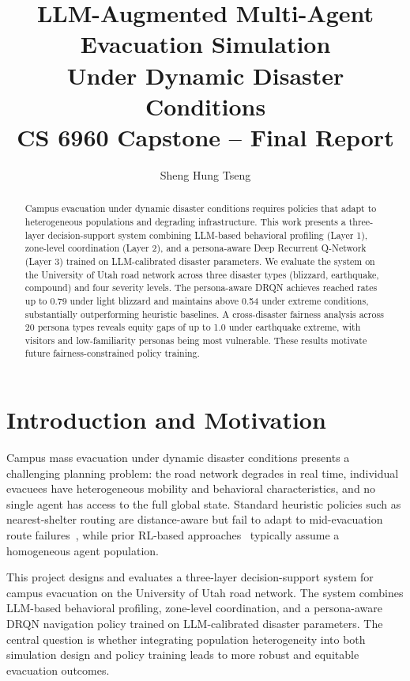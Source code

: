 \documentclass[11pt]{article}
\title{\textbf{LLM-Augmented Multi-Agent Evacuation Simulation\\
Under Dynamic Disaster Conditions}\\[0.4em]
\large CS 6960 Capstone -- Final Report}
\author{Sheng Hung Tseng}
\date{}
\begin{document}
\maketitle

\onehalfspacing

\begin{abstract}
Campus evacuation under dynamic disaster conditions requires policies that adapt to heterogeneous populations and degrading infrastructure. This work presents a three-layer decision-support system combining LLM-based behavioral profiling (Layer 1), zone-level coordination (Layer 2), and a persona-aware Deep Recurrent Q-Network (Layer 3) trained on LLM-calibrated disaster parameters. We evaluate the system on the University of Utah road network across three disaster types (blizzard, earthquake, compound) and four severity levels. The persona-aware DRQN achieves reached rates up to 0.79 under light blizzard and maintains above 0.54 under extreme conditions, substantially outperforming heuristic baselines. A cross-disaster fairness analysis across 20 persona types reveals equity gaps of up to 1.0 under earthquake extreme, with visitors and low-familiarity personas being most vulnerable. These results motivate future fairness-constrained policy training.
\end{abstract}

\section{Introduction and Motivation}

Campus mass evacuation under dynamic disaster conditions presents a challenging planning problem: the road network degrades in real time, individual evacuees have heterogeneous mobility and behavioral characteristics, and no single agent has access to the full global state. Standard heuristic policies such as nearest-shelter routing are distance-aware but fail to adapt to mid-evacuation route failures~\cite{chen2018}, while prior RL-based approaches~\cite{mnih2015} typically assume a homogeneous agent population.

This project designs and evaluates a three-layer decision-support system for campus evacuation on the University of Utah road network. The system combines LLM-based behavioral profiling, zone-level coordination, and a persona-aware DRQN navigation policy trained on LLM-calibrated disaster parameters. The central question is whether integrating population heterogeneity into both simulation design and policy training leads to more robust and equitable evacuation outcomes.
\end{document}
